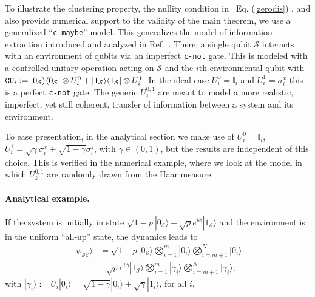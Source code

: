 \documentclass[a4paper,11pt,accepted=2024-09-14]{quantumarticle}
\newcommand\myeqref[1]{
	Eq. (\textup{\ref{#1}})
}
\newcommand{\bra}[1]    {\langle #1|}
\newcommand{\ket}[1]    {| #1 \rangle}
\newcommand{\+}         {\dagger}
\newcommand{\mc}[1]{\mathcal{#1}}
\begin{document}
To illustrate the clustering property, the nullity condition in~\myeqref{zerodis}, and also provide numerical support to the validity of the main theorem, 
we use a generalized ``{\tt c-maybe}'' model. This generalizes the model of information extraction introduced and analyzed in Ref.~\cite{touil2021eavesdropping}. There, a single qubit $\mc{S}$ interacts with an environment of qubits via an imperfect {\tt c-not} gate. This is modeled with a controlled-unitary operation acting on $\mc{S}$ and the $i$th environmental qubit with ${\tt CU}_i := \ket{0_\mc{S}}\bra{0_\mc{S}} \otimes U_i^{0} + \ket{1_\mc{S}}\bra{1_\mc{S}} \otimes U_i^{1}$. In the ideal case $U_i^{0} = \mathbb{I}_{i}$ and $U_i^{1} = \sigma^x_{i}$ this is a perfect {\tt c-not} gate. The generic $U_i^{0,1}$ are meant to model a more realistic, imperfect, yet still coherent, transfer of information between a system and its environment.

To ease presentation, in the analytical section we make use of $U_i^{0} = \mathbb{I}_i$, $U_i^{1} = \sqrt{\gamma} \sigma^x_i + \sqrt{1-\gamma} \sigma_i^z$, with $\gamma \in (0,1)$, but the results are independent of this choice. This is verified in the numerical example, where we look at the model in which $U_k^{0,1}$ are randomly drawn from the Haar measure.

\paragraph{Analytical example.} If the system is initially in state $\sqrt{1-p}\ket{0_{\mc{S}}}+\sqrt{p}e^{i\phi}\ket{1_{\mc{S}}}$ and the environment is in the uniform ``all-up'' state, the dynamics leads to
\begin{equation}
\begin{split}\label{eq:cmaybe_state}
| \psi_\mathcal{SE} \rangle&= \sqrt{1-p} | 0_\mathcal{S} \rangle \bigotimes_{i=1}^{m} | 0_{i} \rangle \bigotimes_{i=m+1}^{N} | 0_{i} \rangle\\ &+ \sqrt{p}e^{i\phi} | 1_\mathcal{S} \rangle \bigotimes_{i=1}^{m} | \gamma_{i} \rangle \bigotimes_{i=m+1}^{N} | \gamma_{i} \rangle,
\end{split}
\end{equation}
with $\ket{\gamma_{i}} := U_i \ket{0_i} = \sqrt{1-\gamma} \ket{0_i} + \sqrt{\gamma}\ket{1_i}$, for all $i$. 
\end{document}
